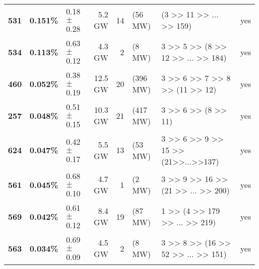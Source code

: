 \begin{tabular}{lllrrllc}
\textbf{531} & \textbf{ 0.151\%} &  0.18$\pm$0.28 &       5.2 GW &      14 & (56 MW) & \multicolumn{1}{p{12em}}{                        (3 >> 11 >> ... >> 159) } &                yes \\
\textbf{534} & \textbf{ 0.113\%} &  0.63$\pm$0.12 &       4.3 GW &        2 & (8 MW) & \multicolumn{1}{p{12em}}{              3 >> 5 >> (8 >> 12 >> ... >> 184) } &                yes \\
\textbf{460} & \textbf{ 0.052\%} &  0.38$\pm$0.19 &      12.5 GW &     20 & (396 MW) & \multicolumn{1}{p{12em}}{                 3 >> 6 >> 7 >> 8 >> (11 >> 12) } &                yes \\
\textbf{257} & \textbf{ 0.048\%} &  0.51$\pm$0.15 &      10.3 GW &     21 & (417 MW) & \multicolumn{1}{p{12em}}{                            3 >> 6 >> (8 >> 11) } &                yes \\
\textbf{624} & \textbf{ 0.047\%} &  0.42$\pm$0.17 &       5.5 GW &      13 & (53 MW) & \multicolumn{1}{p{12em}}{        3 >> 6 >> 9 >> 15 >> (21>>...>>137) } &                yes \\
\textbf{561} & \textbf{ 0.045\%} &  0.68$\pm$0.10 &       4.7 GW &        1 & (2 MW) & \multicolumn{1}{p{12em}}{             3 >> 9 >> 16 >> (21 >> ... >> 200) } &                yes \\
\textbf{569} & \textbf{ 0.042\%} &  0.61$\pm$0.12 &       8.4 GW &      19 & (87 MW) & \multicolumn{1}{p{12em}}{                  1 >> (4 >> 179 >> ... >> 219) } &                yes \\
\textbf{563} & \textbf{ 0.034\%} &  0.69$\pm$0.09 &       4.5 GW &        2 & (8 MW) & \multicolumn{1}{p{12em}}{             3 >> 8 >> (16 >> 52 >> ... >> 151) } &                yes \\

\end{tabular}
